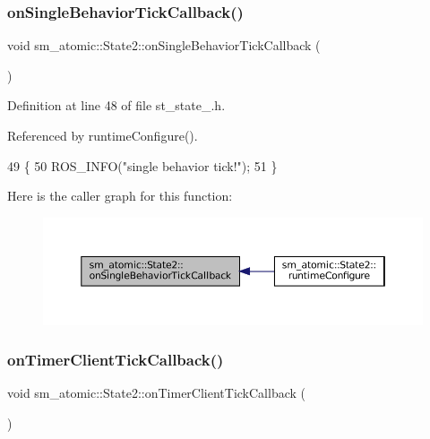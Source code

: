 \subsubsection{\texorpdfstring{on\+Single\+Behavior\+Tick\+Callback()}{onSingleBehaviorTickCallback()}}
{\footnotesize\ttfamily void sm\+\_\+atomic\+::\+State2\+::on\+Single\+Behavior\+Tick\+Callback (\begin{DoxyParamCaption}{ }\end{DoxyParamCaption})\hspace{0.3cm}{\ttfamily [inline]}}



Definition at line 48 of file st\+\_\+state\+\_.\+h.



Referenced by runtime\+Configure().


\begin{DoxyCode}
49     \{
50         ROS\_INFO(\textcolor{stringliteral}{"single behavior tick!"});
51     \}
\end{DoxyCode}
Here is the caller graph for this function\+:
\nopagebreak
\begin{figure}[H]
\begin{center}
\leavevmode
\includegraphics[width=350pt]{structsm__atomic_1_1State2_a871fb6c688a61bb4902ea6d44f51025c_icgraph}
\end{center}
\end{figure}
\mbox{\label{structsm__atomic_1_1State2_ab265295bfddde63b2dcf5f97bfc44e48}} 
\subsubsection{\texorpdfstring{on\+Timer\+Client\+Tick\+Callback()}{onTimerClientTickCallback()}}
{\footnotesize\ttfamily void sm\+\_\+atomic\+::\+State2\+::on\+Timer\+Client\+Tick\+Callback (\begin{DoxyParamCaption}{ }\end{DoxyParamCaption})\hspace{0.3cm}{\ttfamily [inline]}}



